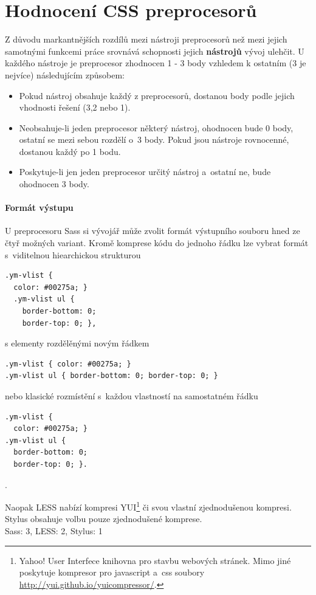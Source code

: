 \documentclass[thesis=B,czech]{FITthesis}[2012/06/26]
\begin{document}
\section{Hodnocení CSS preprocesorů}
Z důvodu markantnějších rozdílů mezi nástroji preprocesorů než mezi jejich samotnými funkcemi práce srovnává schopnosti jejich \textbf{nástrojů} vývoj ulehčit. U každého nástroje je preprocesor zhodnocen 1 - 3 body vzhledem k ostatním (3 je nejvíce) následujícím způsobem:

\begin{itemize}
 \item Pokud nástroj obsahuje každý z preprocesorů, dostanou body podle jejich vhodnosti řešení (3,2 nebo 1). 
 \item Neobsahuje-li jeden preprocesor některý nástroj, ohodnocen bude 0 body, ostatní se mezi sebou rozdělí o~3 body. Pokud jsou nástroje rovnocenné, dostanou každý po 1 bodu.
 \item Poskytuje-li jen jeden preprocesor určitý nástroj a~ostatní ne, bude ohodnocen 3 body. 
\end{itemize}

\paragraph{Formát výstupu}

 U preprocesoru Sass si vývojář může zvolit formát výstupního souboru hned ze čtyř možných variant. Kromě komprese kódu do jednoho řádku lze vybrat formát s~viditelnou hiearchickou strukturou
\scriptsize
\begin{verbatim}
.ym-vlist {
  color: #00275a; }
  .ym-vlist ul {
    border-bottom: 0;
    border-top: 0; },
\end{verbatim}
\normalsize
s elementy rozdělěnými novým řádkem 
\scriptsize
\begin{verbatim}
.ym-vlist { color: #00275a; }
.ym-vlist ul { border-bottom: 0; border-top: 0; }
\end{verbatim}
\normalsize
nebo klasické rozmístění s~každou vlastností na samostatném řádku
\scriptsize
\begin{verbatim}
.ym-vlist {
  color: #00275a; }
.ym-vlist ul {
  border-bottom: 0;
  border-top: 0; }.
\end{verbatim}
\normalsize.

Naopak LESS nabízí kompresi YUI\footnote{Yahoo! User Interfece knihovna pro stavbu webových stránek. Mimo jiné poskytuje kompresor pro javascript a~css soubory \url{http://yui.github.io/yuicompressor/}.} či svou vlastní zjednodušenou kompresi. Stylus obsahuje volbu pouze zjednodušené komprese.\\
Sass: 3, LESS: 2, Stylus: 1
\end{document}
